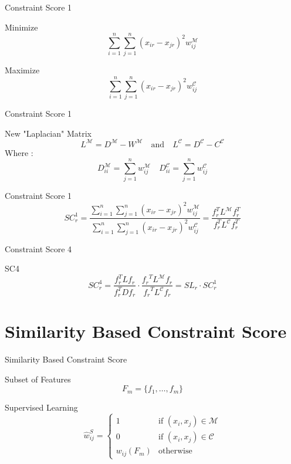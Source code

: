 \documentclass{beamer}
\begin{document}
\begin{frame}{Constraint Score 1}
    \begin{block}{Minimize}
        \[
\sum_{i=1}^{n} \sum_{j=1}^n (x_{ir} - x_{jr})^2 w_{ij}^{\mathcal{M}}
\]
    \end{block}

    \begin{block}{Maximize}
        \[
\sum_{i=1}^{n} \sum_{j=1}^n (x_{ir} - x_{jr})^2 w_{ij}^{\mathcal{C}}
\]

    \end{block}
\end{frame}

\begin{frame}{Constraint Score 1}
    \begin{block}{New "Laplacian" Matrix}
        \[
L^{\mathcal{M}} = D^{\mathcal{M}} - W^{\mathcal{M}} \quad \text{and} \quad L^{\mathcal{C}} = D^{\mathcal{C}} - C^{\mathcal{C}}
\]
Where :
\[
D_{ii}^{\mathcal{M}} = \sum_{j=1}^n w_{ij}^{\mathcal{M}} \quad D_{ii}^{\mathcal{C}} = \sum_{j=1}^n w_{ij}^{\mathcal{C}}
\]

    \end{block}

    \begin{block}{Constraint Score 1}
        \[
SC_{r}^1 = \frac{\sum_{i=1}^n \sum_{j=1}^n (x_{ir} - x_{jr})^2 w_{ij}^{\mathcal{M}}}{\sum_{i=1}^n \sum_{j=1}^n (x_{ir} - x_{jr})^2 w_{ij}^{\mathcal{C}}} = \frac{f_{r}^T L^{\mathcal{M}} f_{r}^T}{f_{r}^T L^{\mathcal{C}} f_{r}^T}
\]
    \end{block}
\end{frame}

\begin{frame}{Constraint Score 4}
    \begin{block}{SC4}
        \[
        SC^4_r = \frac{f_r^{T}Lf_r}{f_r^{T}Df_r} \cdot \frac{{f_r}^{T}L^{\mathcal{M}}f_r}{{f_r}^{T}L^{\mathcal{C}}f_r} = SL_r \cdot SC^1_r
        \]
    \end{block}
\end{frame}

\section{Similarity Based Constraint Score}
\begin{frame}{Similarity Based Constraint Score}
    \begin{block}{Subset of Features}
        \[
F_m = \{f_{1}, \dots, f_{m}\}
\]
    \end{block}
    \begin{block}{Supervised Learning}
        \[
\hat{w}_{ij}^S =
\begin{cases}
  1 & \text{if } (x_i, x_j) \in \mathcal{M} \\
  0 & \text{if } (x_i, x_j) \in \mathcal{C} \\
  w_{ij}(F_m) & \text{otherwise}
\end{cases}
\]
    \end{block}
\end{frame}
\end{document}
